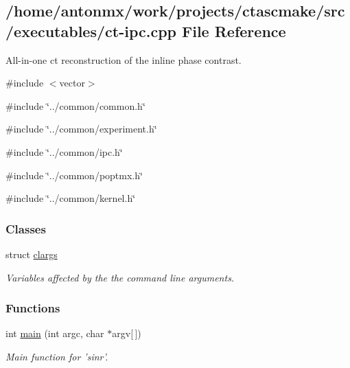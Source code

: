 \hypertarget{ct-ipc_8cpp}{
\subsection{/home/antonmx/work/projects/ctascmake/src/executables/ct-\/ipc.cpp File Reference}
\label{ct-ipc_8cpp}
}


All-\/in-\/one ct reconstruction of the inline phase contrast.  


{\ttfamily \#include $<$vector$>$}\par
{\ttfamily \#include \char`\"{}../common/common.h\char`\"{}}\par
{\ttfamily \#include \char`\"{}../common/experiment.h\char`\"{}}\par
{\ttfamily \#include \char`\"{}../common/ipc.h\char`\"{}}\par
{\ttfamily \#include \char`\"{}../common/poptmx.h\char`\"{}}\par
{\ttfamily \#include \char`\"{}../common/kernel.h\char`\"{}}\par
\subsubsection*{Classes}
\begin{DoxyCompactItemize}
\item 
struct \hyperlink{structclargs}{clargs}
\begin{DoxyCompactList}\small\item\em Variables affected by the the command line arguments. \item\end{DoxyCompactList}\end{DoxyCompactItemize}
\subsubsection*{Functions}
\begin{DoxyCompactItemize}
\item 
int \hyperlink{ct-ipc_8cpp_a0ddf1224851353fc92bfbff6f499fa97}{main} (int argc, char $\ast$argv\mbox{[}$\,$\mbox{]})
\begin{DoxyCompactList}\small\item\em Main function for 'sinr'. \item\end{DoxyCompactList}\end{DoxyCompactItemize}


